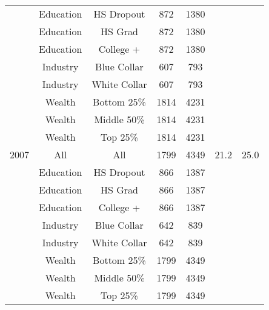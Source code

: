 \documentclass[12pt]{article}
\begin{document}
\begin{tabular}{||l|c|c|c|c|c|c||}
  & Education & HS Dropout & 872 & 1380 & & \\
  & Education & HS Grad & 872 & 1380 & & \\
  & Education & College + & 872 & 1380 & & \\
  & Industry & Blue Collar & 607 & 793 & & \\
  & Industry & White Collar & 607 & 793 & & \\
  & Wealth & Bottom 25\% & 1814 & 4231 & & \\
  & Wealth & Middle 50\% & 1814 & 4231 & & \\
  & Wealth & Top 25\% & 1814 & 4231 & & \\
  2007 & All & All & 1799 & 4349 & 21.2 & 25.0 \\
  & Education & HS Dropout & 866 & 1387 & & \\
  & Education & HS Grad & 866 & 1387 & & \\
  & Education & College + & 866 & 1387 & & \\
  & Industry & Blue Collar & 642 & 839 & & \\
  & Industry & White Collar & 642 & 839 & & \\
  & Wealth & Bottom 25\% & 1799 & 4349 & & \\
  & Wealth & Middle 50\% & 1799 & 4349 & & \\
  & Wealth & Top 25\% & 1799 & 4349 & & \\
\end{tabular}
\end{document}
